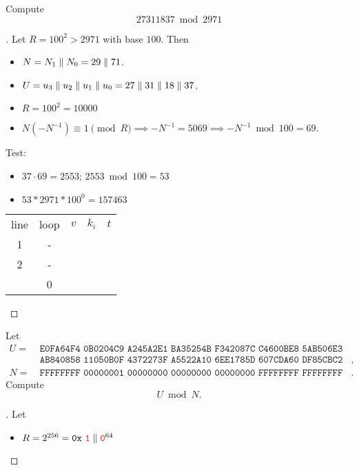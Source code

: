 \begin{example}
Compute \[
27311837\bmod 2971
\]
\begin{proof}[\sol]
Let $R=100^2>2971$ with base $100$. Then \begin{itemize}
\item $N=N_1\parallel N_0 = 29\parallel71$.
\item $U=u_3\parallel u_2\parallel u_1\parallel u_0=27\parallel 31\parallel 18\parallel 37$.
\item $R=100^2=10000$
\item $N(-N^{-1})\equiv 1\pmod{R}\implies -N^{-1}=5069\implies -N^{-1} \bmod 100 = 69$.
\end{itemize}
Test:
\begin{itemize}
	\item $37\cdot 69=2553$; $2553\bmod 100 = 53$
	\item $53*2971*100^0=157463$
\end{itemize}
\begin{table}[h!]\centering
\begin{tabular}{ccccc}
line & loop & $v$ & $k_i$ & $t$ \\
1 & - & \\
2 & - & \\
  & 0 & & &\\
\end{tabular}
\end{table}
\end{proof}
\end{example}

\newpage
\begin{example}
Let \begin{align*}
U = &\ \texttt{E0FA64F4 0B0204C9 A245A2E1 BA35254B F342087C C4600BE8 5AB506E3 6FA5F190}\\
&\ \texttt{AB840858 11050B0F 4372273F A5522A10 6EE1785D 607CDA60 DF85CBC2 46CD3D1F},\\
N = &\ \texttt{FFFFFFFF 00000001 00000000 00000000 00000000 FFFFFFFF FFFFFFFF FFFFFFFF}.
\end{align*}
Compute \[
U\bmod N.
\]\begin{proof}[\sol]
Let \begin{itemize}
	\item $R=2^{256}=\texttt{0x}\ \one\adjacent\zero^{64}$
\end{itemize}
\end{proof}
\end{example}


